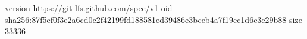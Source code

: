 version https://git-lfs.github.com/spec/v1
oid sha256:87f5ef0f3e2a6cd0c2f42199fd188581ed39486e3bceb4a7f19ec1d6c3c29b88
size 33336
